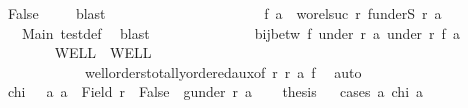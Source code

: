 \begin{isabellebody}
\ False\ \isamarkupfalse%
\ {\isacharasterisk}{\kern0pt}{\isacharasterisk}{\kern0pt}\ \isamarkupfalse%
\ blast\isanewline
\ \ \ \ \ \ \isamarkupfalse%
\isanewline
\ \ \ \ \ \ \isanewline
\ \ \ \ \ \ \isamarkupfalse%
\ {}{\isacharcolon}{\kern0pt}\ {\isachardoublequoteopen}f\ a\ {\isacharequal}{\kern0pt}\ wo{\isacharunderscore}{\kern0pt}rel{\isachardot}{\kern0pt}suc\ r{\isacharprime}{\kern0pt}\ {\isacharparenleft}{\kern0pt}f{\isacharbackquote}{\kern0pt}{\isacharparenleft}{\kern0pt}underS\ r\ a{\isacharparenright}{\kern0pt}{\isacharparenright}{\kern0pt}{\isachardoublequoteclose}\isanewline
\ \ \ \ \ \ \isamarkupfalse%
\ {}{}\ {}\ Main{}\ test{\isacharunderscore}{\kern0pt}def\ \isamarkupfalse%
\ blast\isanewline
\ \ \ \ \ \ \isanewline
\ \ \ \ \ \ \isamarkupfalse%
\ {\isachardoublequoteopen}bij{\isacharunderscore}{\kern0pt}betw\ f\ {\isacharparenleft}{\kern0pt}under\ r\ a{\isacharparenright}{\kern0pt}\ {\isacharparenleft}{\kern0pt}under\ r{\isacharprime}{\kern0pt}\ {\isacharparenleft}{\kern0pt}f\ a{\isacharparenright}{\kern0pt}{\isacharparenright}{\kern0pt}{\isachardoublequoteclose}\isanewline
\ \ \ \ \ \ \isamarkupfalse%
\ WELL\ \ WELL{\isacharprime}{\kern0pt}\ {}\ {}\ {}\ {\isacharasterisk}{\kern0pt}\isanewline
\ \ \ \ \ \ \ \ \ \ \ \ wellorders{\isacharunderscore}{\kern0pt}totally{\isacharunderscore}{\kern0pt}ordered{\isacharunderscore}{\kern0pt}aux{\isacharbrackleft}{\kern0pt}of\ r\ r{\isacharprime}{\kern0pt}\ a\ f{\isacharbrackright}{\kern0pt}\ \isamarkupfalse%
\ auto\isanewline
\ \ \ \ \isamarkupfalse%
\isanewline
\ \ \isamarkupfalse%
\isanewline
\ \ \isanewline
\ \ \isamarkupfalse%
\ {\isacharquery}{\kern0pt}chi\ {\isacharequal}{\kern0pt}\ {\isachardoublequoteopen}{\isacharparenleft}{\kern0pt}{\isasymlambda}\ a{\isachardot}{\kern0pt}\ a\ {\isasymin}\ Field\ r\ {\isasymand}\ False\ {\isasymin}\ g{\isacharbackquote}{\kern0pt}{\isacharparenleft}{\kern0pt}under\ r\ a{\isacharparenright}{\kern0pt}{\isacharparenright}{\kern0pt}{\isachardoublequoteclose}\isanewline
\ \ \isamarkupfalse%
\ {\isacharquery}{\kern0pt}thesis\isanewline
\ \ \isamarkupfalse%
{\isacharparenleft}{\kern0pt}cases\ {\isachardoublequoteopen}{\isasymexists}a{\isachardot}{\kern0pt}\ {\isacharquery}{\kern0pt}chi\ a{\isachardoublequoteclose}{\isacharparenright}{\kern0pt}\isanewline

\end{isabellebody}
